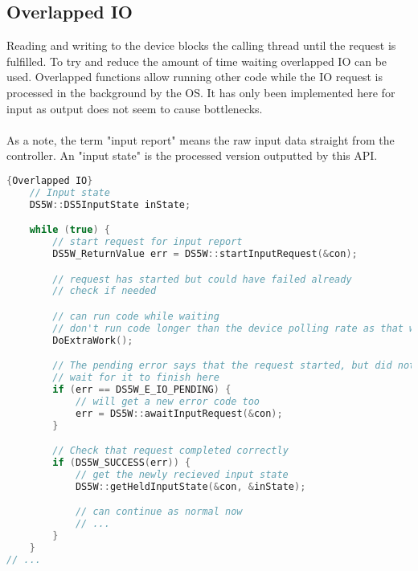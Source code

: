 \subsection{Overlapped IO}
Reading and writing to the device blocks the calling thread until the request is fulfilled. To try and reduce the amount of time waiting overlapped IO can be used. Overlapped functions allow running other code while the IO request is processed in the background by the OS. It has only been implemented here for input as output does not seem to cause bottlenecks.\\
\\
As a note, the term "input report" means the raw input data straight from the controller. An "input state" is the processed version outputted by this API.

\begin{minipage}{\textwidth}
\begin{lstlisting}[language=C++,label=advcode2,caption={Overlapped IO}]{Overlapped IO}
	// Input state
	DS5W::DS5InputState inState;

	while (true) {
		// start request for input report
		DS5W_ReturnValue err = DS5W::startInputRequest(&con);

		// request has started but could have failed already
		// check if needed

		// can run code while waiting 
		// don't run code longer than the device polling rate as that will add latency
		DoExtraWork();

		// The pending error says that the request started, but did not finish instantly
		// wait for it to finish here
		if (err == DS5W_E_IO_PENDING) {
			// will get a new error code too
			err = DS5W::awaitInputRequest(&con);
		}

		// Check that request completed correctly
		if (DS5W_SUCCESS(err)) {
			// get the newly recieved input state
			DS5W::getHeldInputState(&con, &inState);

			// can continue as normal now
			// ...
		}
	}
// ...
\end{lstlisting}
\end{minipage}